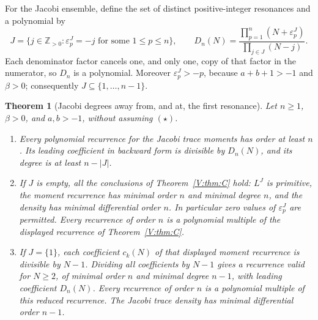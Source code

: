 \documentclass[11pt,a4paper]{article}
\newtheorem{theorem}{Theorem}[section]
\theoremstyle{definition}
\theoremstyle{remark}
\numberwithin{equation}{section}
\begin{document}
For the Jacobi ensemble, define the set of distinct positive-integer
resonances and a polynomial by
\[
 J=\{j\in\mathbb Z_{>0}:\varepsilon^J_p=-j
                  \text{ for some }1\le p\le n\},\qquad
 D_n(N)=\frac{\prod_{p=1}^n(N+\varepsilon^J_p)}
                  {\prod_{j\in J}(N-j)}.
\]
Each denominator factor cancels one, and only one, copy of that factor in
the numerator, so $D_n$ is a polynomial. Moreover
$\varepsilon^J_p>-p$, because $a+b+1>-1$ and $\beta>0$; consequently
$J\subseteq\{1,\ldots,n-1\}$.

\begin{theorem}[Jacobi degrees away from, and at, the first resonance]
\label{V:thm:jacobi-resonances}
Let $n\ge1$, $\beta>0$, and $a,b>-1$, without assuming $(\star)$.
\begin{enumerate}
\item Every polynomial recurrence for the Jacobi trace moments has order
at least $n$. Its leading coefficient in backward form is divisible by
$D_n(N)$, and its degree is at least $n-|J|$.
\item If $J$ is empty, all the conclusions of Theorem~\ref{V:thm:C} hold:
$L^J$ is primitive, the moment recurrence has minimal order $n$ and
minimal degree $n$, and the density has minimal differential order $n$.
In particular zero values of $\varepsilon^J_p$ are permitted. Every
recurrence of order $n$ is a polynomial multiple of the displayed
recurrence of Theorem~\ref{V:thm:C}.
\item If $J=\{1\}$, each coefficient $c_k(N)$ of that displayed moment
recurrence is divisible by $N-1$. Dividing all coefficients by $N-1$
gives a recurrence valid for $N\ge2$, of minimal order $n$ and minimal
degree $n-1$, with leading coefficient $D_n(N)$. Every recurrence of
order $n$ is a polynomial multiple of this reduced recurrence. The
Jacobi trace density has minimal differential order $n-1$.
\end{enumerate}
\end{theorem}
\end{document}
